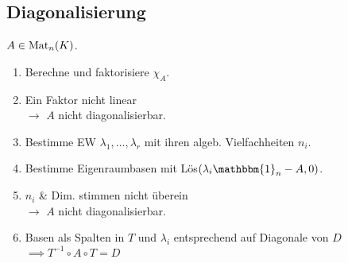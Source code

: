 \subsection*{Diagonalisierung}
$A\in\operatorname{Mat}_n(K)$.
\begin{enumerate}
	\item Berechne und faktorisiere $\chi_A$.
	\item Ein Faktor nicht linear \\
		$\rightarrow$ $A$ nicht diagonalisierbar.
	\item Bestimme EW $\lambda_1,\dots,\lambda_r$ mit ihren algeb. Vielfachheiten $n_i$.
	\item Bestimme Eigenraumbasen mit Lös$(\lambda_i\mathbbm{1}_n-A,0)$.
	\item $n_i$ \& Dim. stimmen nicht überein \\ $\rightarrow$ $A$ nicht diagonalisierbar. 
	\item Basen als Spalten in $T$ und $\lambda_i$ entsprechend auf Diagonale von $D$ \\
		$\implies T^{-1}\circ A \circ T = D$
\end{enumerate}
